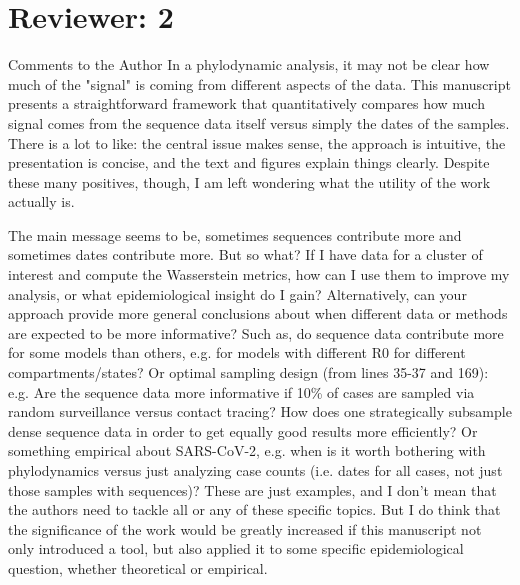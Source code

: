 \documentclass{article}
\begin{document}
\section*{Reviewer: 2}

Comments to the Author
In a phylodynamic analysis, it may not be clear how much of the "signal" is coming from different aspects of the data.  This manuscript presents a straightforward framework that quantitatively compares how much signal comes from the sequence data itself versus simply the dates of the samples.  There is a lot to like: the central issue makes sense, the approach is intuitive, the presentation is concise, and the text and figures explain things clearly.  Despite these many positives, though, I am left wondering what the utility of the work actually is.

The main message seems to be, sometimes sequences contribute more and sometimes dates contribute more.  But so what?  If I have data for a cluster of interest and compute the Wasserstein metrics, how can I use them to improve my analysis, or what epidemiological insight do I gain?  Alternatively, can your approach provide more general conclusions about when different data or methods are expected to be more informative?  Such as, do sequence data contribute more for some models than others, e.g. for models with different R0 for different compartments/states?  Or optimal sampling design (from lines 35-37 and 169): e.g. Are the sequence data more informative if 10\% of cases are sampled via random surveillance versus contact tracing?  How does one strategically subsample dense sequence data in order to get equally good results more efficiently?  Or something empirical about SARS-CoV-2, e.g. when is it worth bothering with phylodynamics versus just analyzing case counts (i.e. dates for all cases, not just those samples with sequences)?  These are just examples, and I don't mean that the authors need to tackle all or any of these specific topics.  But I do think that the significance of the work would be greatly increased if this manuscript not only introduced a tool, but also applied it to some specific epidemiological question, whether theoretical or empirical.
\end{document}
